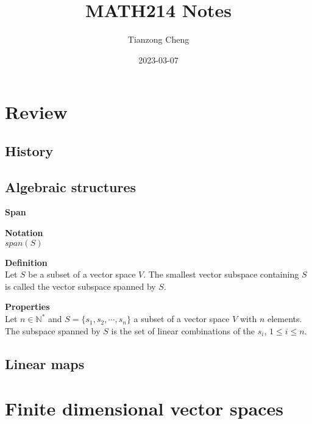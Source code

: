 \documentclass{article}
\title{MATH214 Notes}
\author{Tianzong Cheng}
\date{2023-03-07}
\begin{document}
\maketitle

\section{Review}

\subsection{History}

\subsection{Algebraic structures}

\begin{framed}

    \textbf{Span}

    \begin{framed}
        \textbf{Notation}\\
        $span(S)$
    \end{framed}

    \begin{framed}
        \textbf{Definition}\\
        Let $S$ be a subset of a vector space $V$. The smallest vector subspace containing $S$ is called the vector subspace spanned by $S$.
    \end{framed}

    \begin{framed}
        \textbf{Properties}\\
        Let $n\in \mathbb{N}^{*}$ and $S=\{ s_{1},s_{2},\cdots,s_{n}\}$ a subset of a vector space $V$ with $n$ elements. The subspace spanned by $S$ is the set of linear combinations of the $s_{i}$, $1\leq i\leq n$.
    \end{framed}

\end{framed}

\subsection{Linear maps}

\section{Finite dimensional vector spaces}
\end{document}
